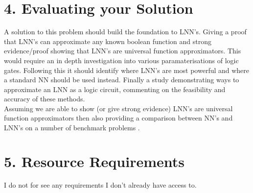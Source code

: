 \documentclass[11pt, a4paper, twoside, openright]{report}
\begin{document}
\section*{4. Evaluating your Solution}

A solution to this problem should build the foundation to LNN's. Giving a proof that LNN's can approximate any known boolean function and strong evidence/proof showing that LNN's are universal function approximators. This would require an in depth investigation into various paramaterisations of logic gates. Following this it should identify where LNN's are most powerful and where a standard NN should be used instead. Finally a study demonstrating ways to approximate an LNN as a logic circuit, commenting on the feasibility and accuracy of these methods.\\

Assuming we are able to show (or give strong evidence) LNN's are universal function approximators then also providing a comparison between NN's and LNN's on a number of benchmark problems .

\section*{5. Resource Requirements}

I do not for see any requirements I don't already have access to.

\backmatter

%


\end{document}
